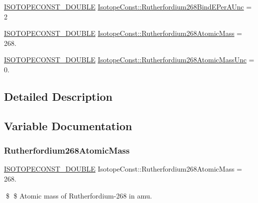 \begin{DoxyCompactItemize}
\item 
\mbox{\hyperlink{group___isotope_const-_macros_ga8f45a7272ce02c0b4c65c44636ed719a}{I\+S\+O\+T\+O\+P\+E\+C\+O\+N\+S\+T\+\_\+\+D\+O\+U\+B\+LE}} \mbox{\hyperlink{group___isotope_const-_rutherfordium-_rf268_gabaab64258960122395917eae2e34cabc}{Isotope\+Const\+::\+Rutherfordium268\+Bind\+E\+Per\+A\+Unc}} = 2
\item 
\mbox{\hyperlink{group___isotope_const-_macros_ga8f45a7272ce02c0b4c65c44636ed719a}{I\+S\+O\+T\+O\+P\+E\+C\+O\+N\+S\+T\+\_\+\+D\+O\+U\+B\+LE}} \mbox{\hyperlink{group___isotope_const-_rutherfordium-_rf268_ga521f94f4bdad2993cc77f67db34339ed}{Isotope\+Const\+::\+Rutherfordium268\+Atomic\+Mass}} = 268.
\item 
\mbox{\hyperlink{group___isotope_const-_macros_ga8f45a7272ce02c0b4c65c44636ed719a}{I\+S\+O\+T\+O\+P\+E\+C\+O\+N\+S\+T\+\_\+\+D\+O\+U\+B\+LE}} \mbox{\hyperlink{group___isotope_const-_rutherfordium-_rf268_gaf5a8ec092d300689a18f78976f836c11}{Isotope\+Const\+::\+Rutherfordium268\+Atomic\+Mass\+Unc}} = 0.
\end{DoxyCompactItemize}


\subsection{Detailed Description}


\subsection{Variable Documentation}
\mbox{\label{group___isotope_const-_rutherfordium-_rf268_ga521f94f4bdad2993cc77f67db34339ed}} 
\subsubsection{\texorpdfstring{Rutherfordium268\+Atomic\+Mass}{Rutherfordium268AtomicMass}}
{\footnotesize\ttfamily \mbox{\hyperlink{group___isotope_const-_macros_ga8f45a7272ce02c0b4c65c44636ed719a}{I\+S\+O\+T\+O\+P\+E\+C\+O\+N\+S\+T\+\_\+\+D\+O\+U\+B\+LE}} Isotope\+Const\+::\+Rutherfordium268\+Atomic\+Mass = 268.}

\$ \$ Atomic mass of Rutherfordium-\/268 in amu. \mbox{\label{group___isotope_const-_rutherfordium-_rf268_gaf5a8ec092d300689a18f78976f836c11}} 
